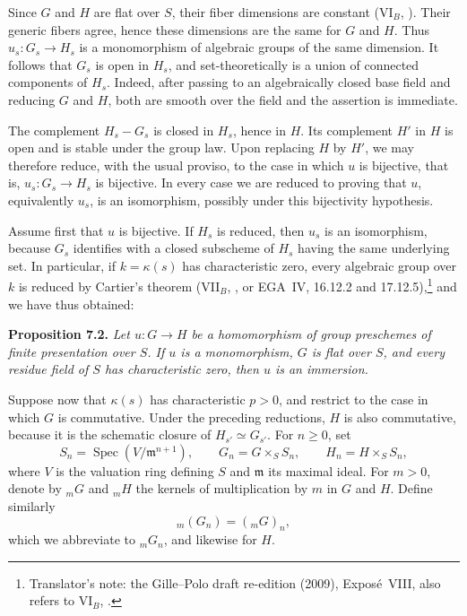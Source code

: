 Since \(G\) and \(H\) are flat over \(S\), their fiber dimensions are
constant (VI\(_B\), ). Their generic fibers agree, hence these dimensions
are the same for \(G\) and \(H\). Thus \(u_s:G_s\to H_s\) is a
monomorphism of algebraic groups of the same dimension. It follows that
\(G_s\) is open in \(H_s\), and set-theoretically is a union of connected
components of \(H_s\). Indeed, after passing to an algebraically closed
base field and reducing \(G\) and \(H\), both are smooth over the field and
the assertion is immediate.

The complement \(H_s-G_s\) is closed in \(H_s\), hence in \(H\). Its
complement \(H'\) in \(H\) is open and is stable under the group law. Upon
replacing \(H\) by \(H'\), we may therefore reduce, with the usual proviso,
to the case in which \(u\) is bijective, that is, \(u_s:G_s\to H_s\) is
bijective. In every case we are reduced to proving that \(u\), equivalently
\(u_s\), is an isomorphism, possibly under this bijectivity hypothesis.

Assume first that \(u\) is bijective. If \(H_s\) is reduced, then \(u_s\) is
an isomorphism, because \(G_s\) identifies with a closed subscheme of
\(H_s\) having the same underlying set. In particular, if
\(k=\kappa(s)\) has characteristic zero, every algebraic group over \(k\)
is reduced by Cartier's theorem (VII\(_B\), , or
EGA~IV, 16.12.2 and 17.12.5),\footnote{Translator's note: the Gille--Polo draft re-edition (2009),
Expos\'e~VIII, also refers to VI\(_B\), .} and we have thus
obtained:

\medskip
\noindent{}\textbf{Proposition 7.2.}
\textit{Let \(u:G\to H\) be a homomorphism of group preschemes of finite
presentation over \(S\). If \(u\) is a monomorphism, \(G\) is flat over
\(S\), and every residue field of \(S\) has characteristic zero, then \(u\)
is an immersion.}

Suppose now that \(\kappa(s)\) has characteristic \(p>0\), and restrict to
the case in which \(G\) is commutative. Under the preceding reductions,
\(H\) is also commutative, because it is the schematic closure of
\(H_{s'}\simeq G_{s'}\). For \(n\geq0\), set
\[
  S_n=\operatorname{Spec}(V/\mathfrak m^{n+1}),\qquad
  G_n=G\times_SS_n,\qquad H_n=H\times_SS_n,
\]
where \(V\) is the valuation ring defining \(S\) and \(\mathfrak m\) its
maximal ideal. For \(m>0\), denote by \({}_mG\) and \({}_mH\) the kernels
of multiplication by \(m\) in \(G\) and \(H\). Define similarly
\[
  {}_m(G_n)=({}_mG)_n,
\]
which we abbreviate to \({}_mG_n\), and likewise for \(H\).

